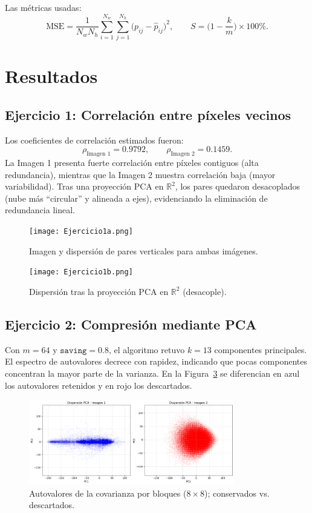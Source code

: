 \documentclass[12pt]{article}
\begin{document}
Las métricas usadas:
\[
\mathrm{MSE}=\frac{1}{N_w N_h}\sum_{i=1}^{N_w}\sum_{j=1}^{N_h}\big(p_{ij}-\widehat{p}_{ij}\big)^2,
\qquad
S=\Big(1-\frac{k}{m}\Big)\times 100\%.
\]

\section{Resultados}
\subsection{Ejercicio 1: Correlación entre píxeles vecinos}
Los coeficientes de correlación estimados fueron:
\[
\rho_{\text{Imagen 1}} = 0.9792,
\qquad
\rho_{\text{Imagen 2}} = 0.1459.
\]
La Imagen 1 presenta fuerte correlación entre píxeles contiguos (alta redundancia), mientras que la Imagen 2 muestra correlación baja (mayor variabilidad). Tras una proyección PCA en \(\mathbb{R}^2\), los pares quedaron desacoplados (nube más “circular” y alineada a ejes), evidenciando la eliminación de redundancia lineal.

\begin{figure}[h!]
    \centering
    \texttt{[image: Ejercicio1a.png]}
    \caption{Imagen y dispersión de pares verticales para ambas imágenes.}
    \label{fig:ej1a}
\end{figure}

\begin{figure}[h!]
    \centering
    \texttt{[image: Ejercicio1b.png]}
    \caption{Dispersión tras la proyección PCA en \(\mathbb{R}^2\) (desacople).}
    \label{fig:ej1b}
\end{figure}

\subsection{Ejercicio 2: Compresión mediante PCA}
Con \(m=64\) y \(\texttt{saving}=0.8\), el algoritmo retuvo \(k=13\) componentes principales. El espectro de autovalores decrece con rapidez, indicando que pocas componentes concentran la mayor parte de la varianza. En la Figura~\ref{fig:ej2} se diferencian en azul los autovalores retenidos y en rojo los descartados.

\begin{figure}[h!]
    \centering
    \includegraphics[width=0.8\textwidth]{Ejercicio2.png}
    \caption{Autovalores de la covarianza por bloques (\(8\times 8\)); conservados vs. descartados.}
    \label{fig:ej2}
\end{figure}
\end{document}
